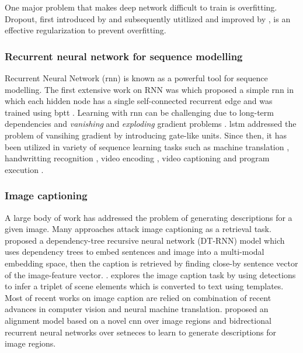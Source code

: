 		One major problem that makes deep network difficult to train is overfitting. Dropout, first introduced by \cite{DBLP:journals/corr/abs-1207-0580} and subsequently utitlized and improved by \cite{wang2013fast, ba2013adaptive}, is an effective regularization to prevent overfitting.

		\subsubsection{Recurrent neural network for sequence modelling}
		Recurrent Neural Network (\gls{rnn}) is known as a powerful tool for sequence modelling. The first extensive work on RNN was \cite{elman1990finding} which proposed a simple \gls{rnn} in which each hidden node has a single self-connected recurrent edge and was trained using \gls{bptt} \cite{werbos1990backpropagation}. Learning with \gls{rnn} can be challenging due to long-term dependencies and \textit{vanishing} and \textit{exploding} gradient problems \cite{bengio1994learning}. \gls{lstm} \cite{Hochreiter:1997:LSM:1246443.1246450, graves2012} addressed the problem of vansihing gradient by introducing gate-like units. Since then, it has been utilized in variety of sequence learning tasks such as machine translation \cite{export:201107, DBLP:journals/corr/SutskeverVL14}, handwritting recognition \cite{liwicki2007novel}, video encoding \cite{DBLP:journals/corr/SrivastavaMS15}, video captioning \cite{DBLP:journals/corr/VenugopalanRDMD15} and program execution \cite{DBLP:journals/corr/ZarembaS14}.

		\subsubsection{Image captioning}
		A large body of work has addressed the problem of generating descriptions for a given image. Many approaches attack image captioning as a retrieval task. \cite{DBLP:journals/tacl/SocherKLMN14} proposed a dependency-tree recursive neural network (DT-RNN) model which uses dependency trees to embed sentences and image into a multi-modal embedding space, then the caption is retrieved by finding close-by sentence vector of the image-feature vector. \cite{Ordonez:2011:im2text} .\cite{Farhadi:2010:PTS:1888089.1888092} explores the image caption task by using detections to infer a triplet of scene elements which is converted to text using templates. Most of recent works on image caption are relied on combination of recent advances in computer vision and neural machine translation. \cite{DBLP:journals/corr/KarpathyF14} proposed an alignment model based on a novel \gls{cnn} \cite{Simonyan14c} over image regions and bidrectional recurrent neural networks over setneces to learn to generate descriptions for image regions. \cite{DBLP:journals/corr/LebretPC15, DBLP:journals/corr/FangGISDDGHMPZZ14, DBLP:journals/corr/DonahueHGRVSD14}


